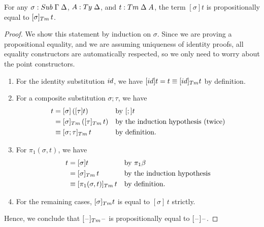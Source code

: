 \documentclass[a4paper,UKenglish,numberwithinsect,cleveref,thm-restate]{lipics-v2021}
\begin{document}
\begin{proposition}\label{prop:correctness-1}
  For any $\sigma : \Sub\;\Gamma\;\Delta$, $A : \Ty\;\Delta$, and $t : \Tm\;\Delta\;A$, the term $[\sigma]t$ is propositionally equal to $[\sigma]_{\Tm}\,t$.
\end{proposition}
\begin{proof}
  We show this statement by induction on $\sigma$. Since we are proving a propositional equality, and we are assuming uniqueness of identity proofs, all equality constructors are automatically respected, so we only need to worry about the point constructors.
  \begin{enumerate}
    \item For the identity substitution $\idS$, we have $[\idS]t = t \judgeq [\idS]_{\Tm} t$ by definition.
    \item For a composite substitution $\sigma; \tau$, we have
      \begin{align*}
        [\sigma;\tau]t & = [\sigma]\,([\tau] t)            && \text{by $[;]t$} \\
                       & = [\sigma]_{\Tm}\,([\tau]_{\Tm}\,t) && \text{by the induction hypothesis (twice)} \\ %
                       & \judgeq [\sigma;\tau]_{\Tm}\,t && \text{by definition.}
      \end{align*}
    \item For $\pi_1(\sigma, t)$, we have
      \begin{align*}
        [\pi_1(\sigma, t)]t & = [\sigma] t               && \text{by $\pi_1\beta$} \\
                            & = [\sigma]_{\Tm} \,t       && \text{by the induction hypothesis} \\ %
                            & \judgeq [\pi_1(\sigma, t)]_{\Tm}\,t && \text{by definition.}
      \end{align*}
    \item For the remaining cases, $[\sigma]_{\Tm} t$ is equal to $[\sigma]\,t$ strictly.
  \end{enumerate}
  Hence, we conclude that $[\blank]_{\Tm}\blank$ is propositionally equal to $[\mathord{\hspace{1pt}\text{--}\hspace{1pt}}]\mathord{\hspace{1pt}\text{--}\hspace{1pt}}$.
\end{proof}
\end{document}
